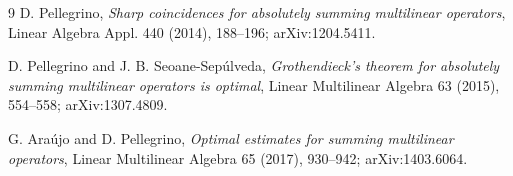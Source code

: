 \documentclass[11pt]{article}
\begin{document}
\begin{thebibliography}{9}
D. Pellegrino,
\emph{Sharp coincidences for absolutely summing multilinear operators},
Linear Algebra Appl. 440 (2014), 188--196; arXiv:1204.5411.

D. Pellegrino and J. B. Seoane-Sep\'ulveda,
\emph{Grothendieck's theorem for absolutely summing multilinear operators is optimal},
Linear Multilinear Algebra 63 (2015), 554--558; arXiv:1307.4809.

G. Ara\'ujo and D. Pellegrino,
\emph{Optimal estimates for summing multilinear operators},
Linear Multilinear Algebra 65 (2017), 930--942; arXiv:1403.6064.
\end{thebibliography}
\end{document}
